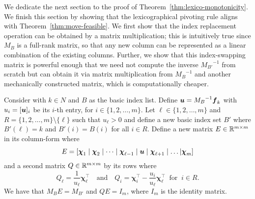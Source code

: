 We dedicate the next section to the proof of Theorem~\ref{thm:lexico-monotonicity}. We finish this section by showing that the lexicographical pivoting rule aligns with Theorem~\ref{thm:move-feasible}. 
We first show that the index replacement operation can be obtained by a matrix multiplication; this is intuitively true since ${M_B}$ is a full-rank matrix, so that any new column can be represented as a linear combination of the existing columns. Further, we show that this index-swapping matrix is powerful enough that we need not compute the inverse ${M_{B'}}^{-1}$ from scratch but can obtain it via matrix multiplication from ${M_{B}}^{-1}$ and another mechanically constructed matrix, which is computationally cheaper. 

\begin{lemma}\label{lemma:change-of-basis}
Consider \LPSA with $k \in N$ and $B$ as the basic index list. Define ${\boldsymbol u} = {M_B}^{-1} {\boldsymbol f}_k$ with $u_i = [{\boldsymbol u}]_i$ be its $i$-th entry, for $i\in\{1, 2, \dots, m\}$. Let $\ell \in \{1,2,\dots, m\}$ and $R = \{1,2,\dots,m\}\setminus \{\ell\}$ such that $u_\ell > 0$ and define a new basic index set $B'$ where $B'(\ell) = k$ and $B'(i) = B(i)$ for all $i\in R$. 
Define a new matrix $E \in \mathbb R^{m\times m}$ in its column-form where
\[ E = [\boldsymbol\chi_1 \mid \boldsymbol\chi_2\mid \dots \mid \boldsymbol\chi_{\ell-1} \mid {\boldsymbol u} \mid \boldsymbol\chi_{\ell+1} \mid \dots | \boldsymbol\chi_m] \] and a second matrix $Q\in \mathbb R^{m\times m}$ by its rows where 
\[ Q_\ell = \frac{1}{u_\ell} \bm\chi_\ell^\top \quad\text{and}\quad 
Q_i = \bm\chi_i^\top - \frac{u_i}{u_{\ell}} \bm\chi_{\ell}^\top ~\text{ for }~i \in R. \]
We have that $M_B E = M_{B'}$ and $ QE = I_m$, where $ I_m$ is the identity matrix. 
\end{lemma}
